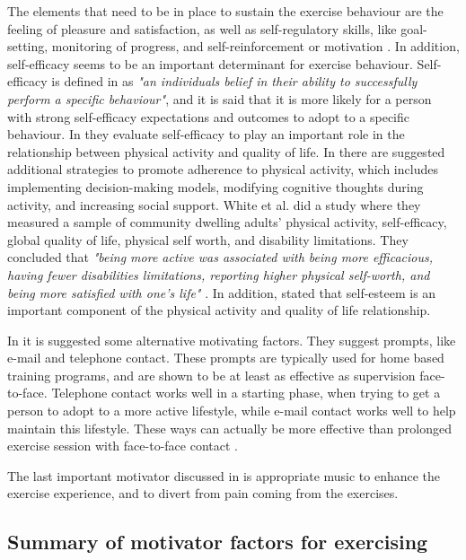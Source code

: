 The elements that need to be in place to sustain the exercise behaviour are the feeling of pleasure and satisfaction, as well as self-regulatory skills, like goal-setting, monitoring of progress, and self-reinforcement or motivation \cite{schutzer}. In addition, self-efficacy seems to be an important determinant for exercise behaviour. Self-efficacy is defined in \cite{schutzer} as \emph{"an individuals belief in their ability to successfully perform a specific behaviour"}, and it is said that it is more likely for a person with strong self-efficacy expectations and outcomes to adopt to a specific behaviour. In \cite{white} they evaluate self-efficacy to play an important role in the relationship between physical activity and quality of life. In \cite{chao} there are suggested additional strategies to promote adherence to physical activity, which includes implementing decision-making models, modifying cognitive thoughts during activity, and increasing social support. White et al. did a study where they measured a sample of community dwelling adults' physical activity, self-efficacy, global quality of life, physical self worth, and disability limitations. They concluded that \emph{"being more active was associated with being more efficacious, having fewer disabilities limitations, reporting higher physical self-worth, and being more satisfied with one's life"} \cite{white}. In addition, \cite{white} stated that self-esteem is an important component of the physical activity and quality of life relationship. 

In \cite{schutzer} it is suggested some alternative motivating factors. They suggest prompts, like e-mail and telephone contact. These prompts are typically used for home based training programs, and are shown to be at least as effective as supervision face-to-face. Telephone contact works well in a starting phase, when trying to get a person to adopt to a more active lifestyle, while e-mail contact works well to help maintain this lifestyle. These ways can actually be more effective than prolonged exercise session with face-to-face contact \cite{schutzer}. 

The last important motivator discussed in \cite{schutzer} is appropriate music to enhance the exercise experience, and to divert from pain coming from the exercises. 


\subsection{Summary of motivator factors for exercising}
\label{subsec:motivator}

